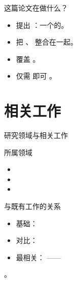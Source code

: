 {\begin{frame}{这篇论文在做什么？}
  \begin{itemize}
    \item 提出 ：一个的。
    \item 把 、 整合在一起。
    \item 覆盖 。
    \item 仅需  即可 。
  \end{itemize}
  \deckgap
  \centering
  \hfill
  \hfill
\end{frame}


\renewcommand{\secblurb}{\ph{本节一句话主旨：相对已有工作的关键差异}}
\section{相关工作}

\begin{frame}{研究领域与相关工作}
  \begin{block}{所属领域}
    \begin{itemize}
      \item {}
      \item {}
      \item {}
    \end{itemize}
  \end{block}
  \tightgap
  \begin{block}{与既有工作的关系}
    \begin{itemize}
      \item 基础：
      \item 对比：
      \item 最相关： —— 
    \end{itemize}
  \end{block}
  \tightgap
  \begin{callout}[关键差异]
    。
  \end{callout}
\end{frame}

}
